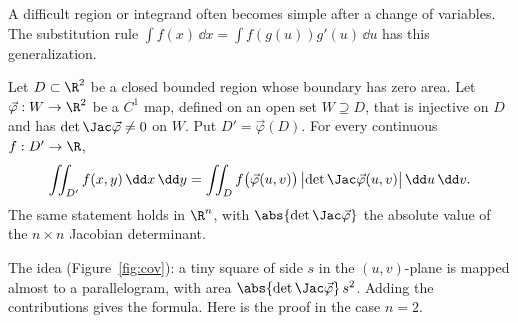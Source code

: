 A difficult region or integrand often becomes simple after a change of variables. The substitution rule $\int f(x)\,\dd x=\int f(g(u))g'(u)\,\dd u$ has this generalization.

\begin{theorem}\label{thm:cov}
Let $D\subset\R^2$ be a closed bounded region whose boundary has zero area. Let $\vec\varphi:W\to\R^2$ be a $C^1$ map, defined on an open set $W\supseteq D$, that is injective on $D$ and has $\det\Jac\vec\varphi\ne0$ on $W$. Put $D'=\vec\varphi(D)$. For every continuous $f:D'\to\R$,
\[
\iint_{D'}f(x,y)\,\dd x\,\dd y=\iint_Df\bigl(\vec\varphi(u,v)\bigr)\,\bigl\lvert\det\Jac\vec\varphi(u,v)\bigr\rvert\,\dd u\,\dd v .
\]
The same statement holds in $\R^n$, with $\abs{\det\Jac\vec\varphi}$ the absolute value of the $n\times n$ Jacobian determinant.
\end{theorem}

The idea (Figure~\ref{fig:cov}): a tiny square of side $s$ in the $(u,v)$-plane is mapped almost to a parallelogram, with area $\abs{\det\Jac\vec\varphi}\,s^2$. Adding the contributions gives the formula. Here is the proof in the case $n=2$.

